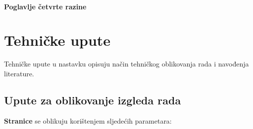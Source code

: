\documentclass{foi}
\begin{document}
\lipsum[2]

\subsubsection{Poglavlje četvrte razine}

\lipsum[3-4]

\chapter{Tehničke upute}

Tehničke upute u nastavku opisuju način tehničkog oblikovanja rada i navođenja literature.

\section{Upute za oblikovanje izgleda rada}

\begin{flushleft}\textbf{Stranice} se oblikuju korištenjem sljedećih parametara:\end{flushleft}
\end{document}
